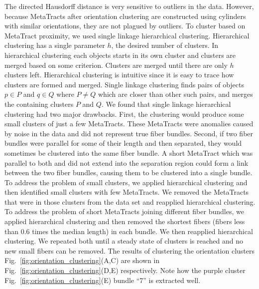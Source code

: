 The directed Hausdorff distance is very sensitive to outliers in the data.
However, because MetaTracts after orientation clustering are constructed using cylinders with similar orientations, they are not plagued by outliers.
To cluster based on MetaTract proximity, we used single linkage hierarchical clustering.
Hierarchical clustering has a single parameter $h$, the desired number of clusters.
In hierarchical clustering each objects starts in its own cluster and clusters are merged based on some criterion.
Clusters are merged until there are only $h$ clusters left.
Hierarchical clustering is intuitive since it is easy to trace how clusters are formed and merged.
Single linkage clustering finds pairs of objects $p \in P$ and $q \in Q$ where $P \neq Q$ which are closer than other such pairs, and merges the containing clusters $P$ and $Q$.
We found that single linkage hierarchical clustering had two major drawbacks.
First, the clustering would produce some small clusters of just a few MetaTracts.
These MetaTracts were anomalies caused by noise in the data and did not represent true fiber bundles.
Second, if two fiber bundles were parallel for some of their length and then separated, they would sometimes be clustered into the same fiber bundle.
A short MetaTract which was parallel to both and did not extend into the separation region could form a link between the two fiber bundles, causing them to be clustered into a single bundle.
To address the problem of small clusters, we applied hierarchical clustering and then identified small clusters with few MetaTracts.
We removed the MetaTracts that were in those clusters from the data set and reapplied hierarchical clustering.
To address the problem of short MetaTracts joining different fiber bundles, we applied hierarchical clustering and then removed the
shortest fibers (fibers less than 0.6 times the median length) in each bundle. We then reapplied hierarchical clustering.
We repeated both until a steady state of clusters is reached and no new small fibers can be removed. The results of clustering the orientation clusters Fig.~\ref{fig:orientation_clustering}(A,C) are shown in Fig.~\ref{fig:orientation_clustering}(D,E) respectively. Note how the purple cluster Fig.~\ref{fig:orientation_clustering}(E) bundle ``7'' is extracted well.
